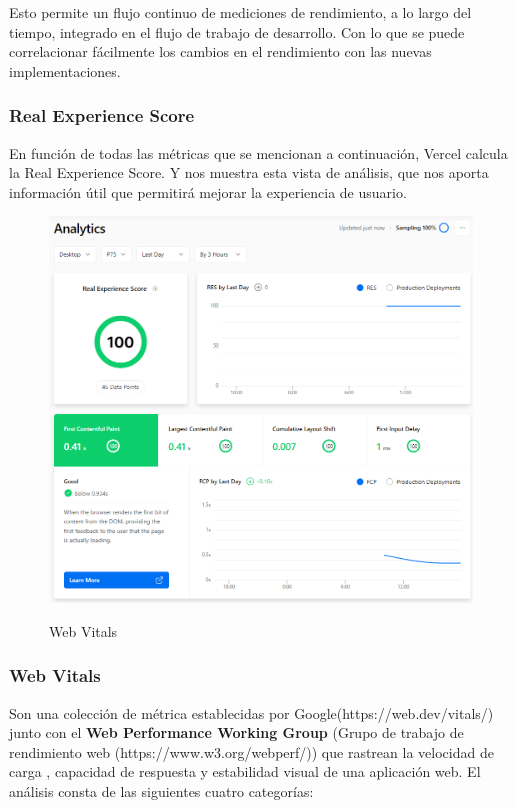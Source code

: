 \documentclass[12pt,twoside,titlepage]{report}
\begin{document}
Esto permite un flujo continuo de mediciones de rendimiento, a lo largo del tiempo, integrado en el flujo de trabajo de desarrollo. Con lo que se puede correlacionar fácilmente los cambios en el rendimiento con las nuevas implementaciones.

\subsubsection{Real Experience Score}

En función de todas las métricas que se mencionan a continuación, Vercel calcula la Real Experience Score. Y nos muestra esta vista de análisis, que nos aporta información útil que permitirá mejorar la experiencia de usuario.

\begin{figure}[H]
    \centering
    \includegraphics[scale=0.5]{Vercel_metrics}
    \label{fig:Vercel_metrics}
    \caption{Web Vitals}
\end{figure}

\subsubsection{Web Vitals}

Son una colección de métrica establecidas por Google(https://web.dev/vitals/) junto con el \textbf{Web Performance Working Group}  (Grupo de trabajo de rendimiento web (https://www.w3.org/webperf/)) que rastrean la velocidad de carga , capacidad de respuesta y estabilidad visual de una aplicación web. El análisis consta de las siguientes cuatro categorías:
\end{document}
